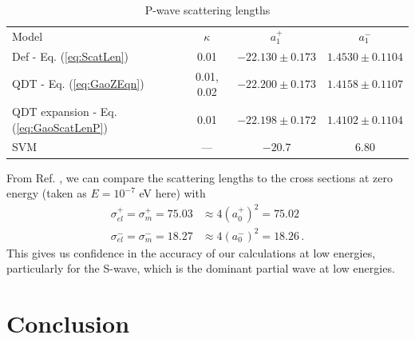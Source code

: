 \documentclass[preprint,showpacs,preprintnumbers,amsmath,amssymb]{revtex4}
\newcommand{\todoi}{\todo[inline]}
\begin{document}
\begin{table}[H]
\begin{center}
\begin{ruledtabular}
\begin{tabular}{l c c c}
Model & $\kappa$ & $a_1^+$ & $a_1^-$ \\
\colrule
Def - Eq. (\ref{eq:ScatLen}) & 0.01 & $-22.130 \pm 0.173$ & $1.4530 \pm 0.1104$ \\
QDT - Eq. (\ref{eq:GaoZEqn}) & 0.01, 0.02 & $-22.200 \pm 0.173$ & $1.4158 \pm 0.1107$ \\
QDT expansion - Eq. (\ref{eq:GaoScatLenP}) & 0.01 & $-22.198 \pm 0.172$ & $1.4102 \pm 0.1104$ \\
\colrule
SVM \cite{Ivanov2002} & --- & $-20.7$ & $6.80$ 
\end{tabular}
\end{ruledtabular}
\caption{P-wave scattering lengths}
\label{tab:PWaveScatLen}
\end{center}
\end{table}

From Ref. \cite{Buckman1989}, we can compare the scattering lengths to the cross sections at zero energy (taken as $E = 10^{-7}$ eV here) with
\begin{subequations}
\label{eq:CrossScatLen}
\begin{align}
\sigma_{el}^+ = \sigma_m^+ = 75.03 & \approx 4 (a_0^+)^2 = 75.02 \\
\sigma_{el}^- = \sigma_m^- = 18.27 & \approx 4 (a_0^-)^2 = 18.26 \, .
\end{align}
\end{subequations}
This gives us confidence in the accuracy of our calculations at low energies, particularly for the S-wave, which is the dominant partial wave at low energies.





\section{Conclusion}
\end{document}
